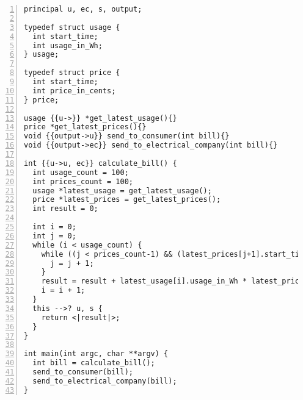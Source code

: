 \begin{lstlisting}[style=dlmc, numbers=left, caption={Inferred labelled smart meter bill calculation example}, label=example:code:calculate_bill-explicit]
principal u, ec, s, output;

typedef struct usage {
  int start_time;
  int usage_in_Wh;
} usage;

typedef struct price {
  int start_time;
  int price_in_cents;
} price;

usage {{u->}} *get_latest_usage(){}
price *get_latest_prices(){}
void {{output->u}} send_to_consumer(int bill){}
void {{output->ec}} send_to_electrical_company(int bill){}

int {{u->u, ec}} calculate_bill() {
  int usage_count = 100;
  int prices_count = 100;
  usage *latest_usage = get_latest_usage();
  price *latest_prices = get_latest_prices();
  int result = 0;

  int i = 0;
  int j = 0;
  while (i < usage_count) {
    while ((j < prices_count-1) && (latest_prices[j+1].start_time <= latest_usage[i].start_time)) {
      j = j + 1;
    }
    result = result + latest_usage[i].usage_in_Wh * latest_prices[j].price_in_cents;
    i = i + 1;
  }
  this -->? u, s {
    return <|result|>;
  }
}

int main(int argc, char **argv) {
  int bill = calculate_bill();
  send_to_consumer(bill);
  send_to_electrical_company(bill);
}
\end{lstlisting}
